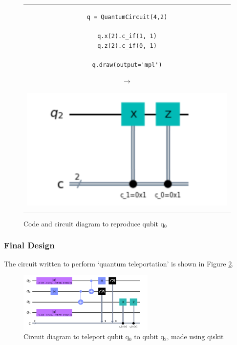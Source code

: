 \begin{figure}[H]
\centering
\begin{tabular}{c}
\begin{minipage}[c]{.45\linewidth}
\begin{verbatim}
q = QuantumCircuit(4,2)

q.x(2).c_if(1, 1)
q.z(2).c_if(0, 1)

q.draw(output='mpl')
\end{verbatim}
\end{minipage}
\begin{minipage}[c]{.1\linewidth}
\centering
$\rightarrow$
\end{minipage}
\begin{minipage}[c]{.4\linewidth}
\centering
\includegraphics[width=\textwidth]{lab3/images/Step4.png}
\end{minipage}\\
\\ 
\end{tabular}
\captionsetup{font = it, labelfont = bf, width=.91\linewidth, justification=centering}
\caption{Code and circuit diagram to reproduce qubit q$_0$}
\label{step4}
\end{figure}

\subsubsection{Final Design}
The circuit written to perform `quantum teleportation' is shown in Figure \ref{fig:teleportCircuit}.
\begin{figure}[H]
    \centering
    \includegraphics[width=0.6\textwidth]{lab3/images/teleportCircuit.png}
    \captionsetup{font = it, labelfont = bf, width=.91\linewidth, justification=centering}
    \caption{Circuit diagram to teleport qubit q$_0$ to qubit q$_2$, made using qiskit}
    \label{fig:teleportCircuit}
\end{figure}

